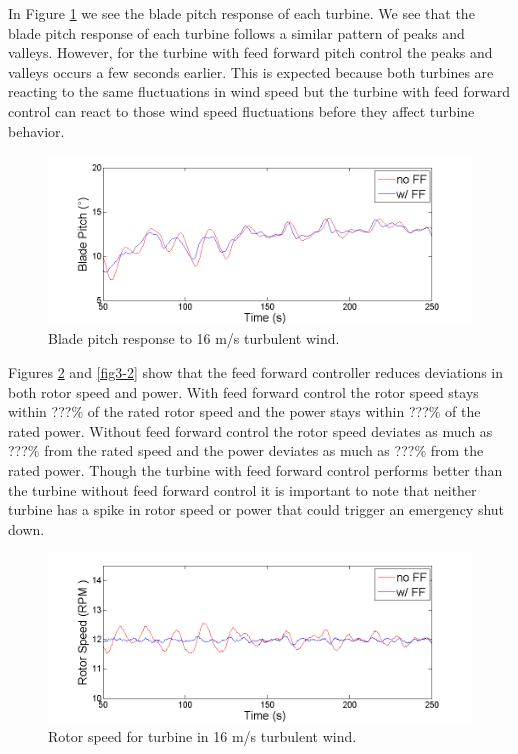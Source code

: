 In Figure \ref{fig3-19} we see the blade pitch response of each turbine. We see that the blade pitch response of each turbine follows a similar pattern of peaks and valleys. However, for the turbine with feed forward pitch control the peaks and valleys occurs a few seconds earlier. This is expected because both turbines are reacting to the same fluctuations in wind speed but the turbine with feed forward control can react to those wind speed fluctuations before they affect turbine behavior. 

\begin{figure}[htbp]
	\centering
		\includegraphics[width = \linewidth]{Figures/ch3Figures/fig3-19.png}
		
	\caption{Blade pitch response to 16 m/s turbulent wind.}
	\label{fig3-19}
\end{figure}

Figures \ref{fig3-20} and \ref{fig3-2} show that the feed forward controller  reduces deviations in both rotor speed and power. With feed forward control the rotor speed stays within ???$\%$ of the rated rotor speed and the power stays within ???$\%$ of the rated power. Without feed forward control the rotor speed deviates as much as ???$\%$ from the rated speed and the power deviates as much as ???$\%$ from the rated power. Though the turbine with feed forward control performs better than the turbine without feed forward control it is important to note that neither turbine has a spike in rotor speed or power that could trigger an emergency shut down.

\begin{figure}[htbp]
	\centering
		\includegraphics[width = \linewidth]{Figures/ch3Figures/fig3-20.png}
		
	\caption{Rotor speed for turbine in 16 m/s turbulent wind.}
	\label{fig3-20}
\end{figure}

